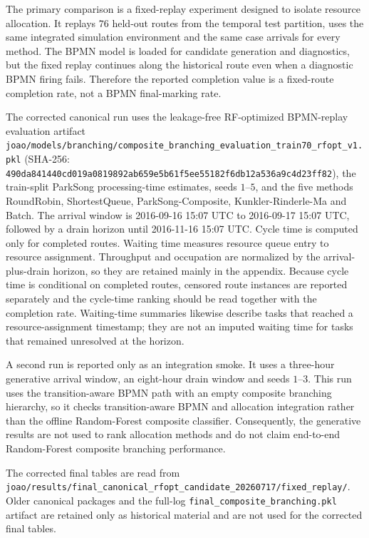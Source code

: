 The primary comparison is a fixed-replay experiment designed to isolate resource
allocation. It replays $76$ held-out routes from the temporal test partition,
uses the same integrated simulation environment and the same case arrivals for
every method. The BPMN model is loaded for candidate generation and diagnostics,
but the fixed replay continues along the historical route even when a diagnostic
BPMN firing fails. Therefore the reported completion value is a fixed-route
completion rate, not a BPMN final-marking rate.

The corrected canonical run uses the leakage-free RF-optimized BPMN-replay evaluation
artifact
\texttt{joao/models/branching/composite\_branching\_evaluation\_train70\_rfopt\_v1.pkl}
(SHA-256:
\texttt{490da841440cd019a0819892ab659e5b61f5ee55182f6db12a536a9c4d23ff82}),
the train-split ParkSong processing-time estimates, seeds $1$--$5$, and the
five methods RoundRobin, ShortestQueue, ParkSong-Composite,
Kunkler-Rinderle-Ma and Batch. The arrival window is 2016-09-16 15:07 UTC to
2016-09-17 15:07 UTC, followed by a drain horizon until 2016-11-16 15:07 UTC.
Cycle time is computed only for completed routes. Waiting time measures resource
queue entry to resource assignment. Throughput and occupation are normalized by
the arrival-plus-drain horizon, so they are retained mainly in the appendix.
Because cycle time is conditional on completed routes, censored route instances
are reported separately and the cycle-time ranking should be read together with
the completion rate. Waiting-time summaries likewise describe tasks that reached
a resource-assignment timestamp; they are not an imputed waiting time for tasks
that remained unresolved at the horizon.

A second run is reported only as an integration smoke. It uses a three-hour
generative arrival window, an eight-hour drain window and seeds $1$--$3$. This
run uses the transition-aware BPMN path with an empty composite branching
hierarchy, so it checks transition-aware BPMN and allocation integration rather
than the offline Random-Forest composite classifier. Consequently, the
generative results are not used to rank allocation methods and do not claim
end-to-end Random-Forest composite branching performance.

The corrected final tables are read from
\texttt{joao/results/final\_canonical\_rfopt\_candidate\_20260717/fixed\_replay/}.
Older canonical packages and the full-log
\texttt{final\_composite\_branching.pkl} artifact are retained only as
historical material and are not used for the corrected final tables.
